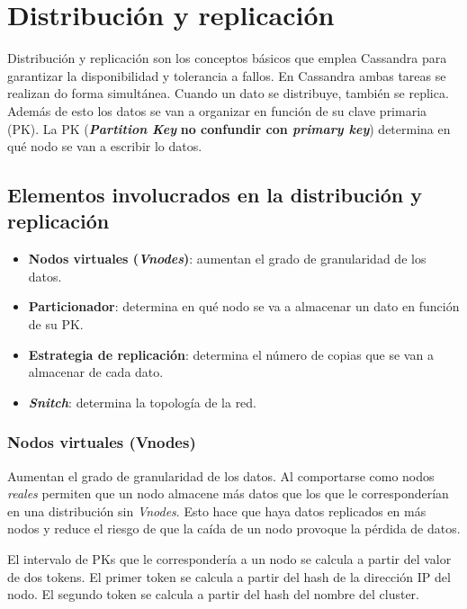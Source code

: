 \documentclass[
]{book}
\providecommand{\tightlist}{%
  \setlength{\itemsep}{0pt}\setlength{\parskip}{0pt}}
\begin{document}
\section{Distribución y replicación}\label{distribuciuxf3n-y-replicaciuxf3n}

Distribución y replicación son los conceptos básicos que emplea Cassandra para garantizar la disponibilidad y tolerancia a fallos. En Cassandra ambas tareas se realizan do forma simultánea. Cuando un dato se distribuye, también se replica. Además de esto los datos se van a organizar en función de su clave primaria (PK). La PK (\textbf{\emph{Partition Key}} \textbf{no confundir con \emph{primary key}}) determina en qué nodo se van a escribir lo datos.

\subsection{Elementos involucrados en la distribución y replicación}\label{elementos-involucrados-en-la-distribuciuxf3n-y-replicaciuxf3n}

\begin{itemize}
\tightlist
\item
  \textbf{Nodos virtuales (\emph{Vnodes})}: aumentan el grado de granularidad de los datos.
\item
  \textbf{Particionador}: determina en qué nodo se va a almacenar un dato en función de su PK.
\item
  \textbf{Estrategia de replicación}: determina el número de copias que se van a almacenar de cada dato.
\item
  \textbf{\emph{Snitch}}: determina la topología de la red.
\end{itemize}

\subsubsection{Nodos virtuales (Vnodes)}\label{nodos-virtuales-vnodes}

Aumentan el grado de granularidad de los datos. Al comportarse como nodos \emph{reales} permiten que un nodo almacene más datos que los que le corresponderían en una distribución sin \emph{Vnodes}. Esto hace que haya datos replicados en más nodos y reduce el riesgo de que la caída de un nodo provoque la pérdida de datos.

El intervalo de PKs que le correspondería a un nodo se calcula a partir del valor de dos tokens. El primer token se calcula a partir del hash de la dirección IP del nodo. El segundo token se calcula a partir del hash del nombre del cluster.
\end{document}
